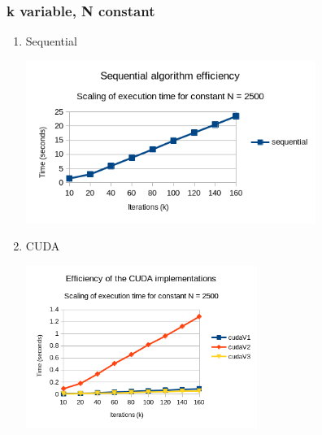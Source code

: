 \documentclass[11pt]{article}
\begin{document}
\subsubsection{k variable, N constant}
\label{sec:orga21fd82}
\begin{enumerate}
\item Sequential
\label{sec:org55f4fe8}
\begin{center}
\includegraphics[height=200]{./images/seq-efficiency.png}
\end{center}
\pagebreak
\item CUDA
\label{sec:org1b1f111}
\begin{center}
\includegraphics[height=200]{./images/cuda-efficiency.png}
\end{center}
\end{enumerate}
\end{document}
